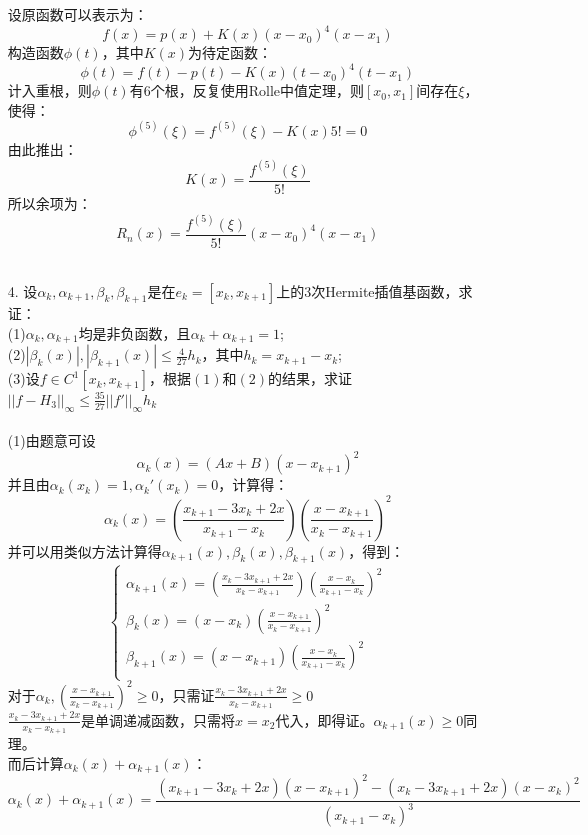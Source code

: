 \documentclass{article}
\begin{document}
\begin{itemize}
		设原函数可以表示为：
		$$f(x) = p(x) + K(x)(x - x_{0})^{4}(x - x_{1})$$
		构造函数$\phi(t)$，其中$K(x)$为待定函数：
		$$\phi(t) = f(t) - p(t) - K(x)(t-x_{0})^{4}(t - x_{1})$$
		计入重根，则$\phi(t)$有6个根，反复使用Rolle中值定理，则$[x_{0}, x_{1}]$间存在$\xi$，使得：
		$$\phi^{(5)}(\xi) = f^{(5)}(\xi) - K(x)5! = 0$$
		由此推出：
		$$K(x) = \frac{ f^{(5)}(\xi)}{5!}$$
		所以余项为：
		$$R_{n}(x) =  \frac{ f^{(5)}(\xi)}{5!}(x - x_{0})^{4}(x - x_{1}) $$\\
		\item[4.]设$\alpha_{k}, \alpha_{k + 1}, \beta_{k}, \beta_{k+1}$是在$e_{k} = [x_{k}, x_{k+1}]$上的3次Hermite插值基函数，求证：\\
		(1)$\alpha_{k}, \alpha_{k + 1}$均是非负函数，且$\alpha_{k} + \alpha_{k + 1} = 1$;\\
		(2)$\left|\beta_{k}(x)\right|,\left|\beta_{k + 1}(x)\right| \le \frac{4}{27}h_{k}$，其中$h_{k} = x_{k+1} - x_{k}$;\\
		(3)设$f\in C^{1}[x_{k}, x_{k+1}]$，根据$(1)$和$(2)$的结果，求证$||f - H_{3}||_{\infty} \le \frac{35}{27}||f'||_{\infty}h_{k}$\\\\
		(1)由题意可设
		$$\alpha_{k}(x) = (Ax + B)(x - x_{k+1})^{2}$$
		并且由$\alpha_{k}(x_{k}) = 1, \alpha_{k}'(x_{k}) = 0$，计算得：
		$$\alpha_{k}(x) = \left(\frac{x_{k+1} - 3x_{k} + 2x}{x_{k+1} - x_{k}}\right)\left(\frac{x - x_{k+1}}{x_{k} - x_{k+1}}\right)^{2}$$
		并可以用类似方法计算得$\alpha_{k+1}(x),\beta_{k}(x), \beta_{k+1}(x)$，得到：
		$$\left\{
		\begin{array}{lcl}
		\alpha_{k+1}(x) = \left(\frac{x_{k} - 3x_{k + 1} + 2x}{x_{k} - x_{k + 1}}\right)\left(\frac{x - x_{k}}{x_{k + 1} - x_{k}}\right)^{2}\\
		\beta_{k}(x) = (x - x_{k})\left(\frac{x-x_{k+1}}{x_{k} - x_{k+1}}\right)^{2}\\
		\beta_{k+1}(x) = (x - x_{k + 1})\left(\frac{x-x_{k}}{x_{k+1} - x_{k}}\right)^{2}\\
		\end{array}\right.$$
		对于$\alpha_{k},\left(\frac{x - x_{k+1}}{x_{k} - x_{k+1}}\right)^{2} \ge 0$，只需证$\frac{x_{k} - 3x_{k + 1} + 2x}{x_{k} - x_{k + 1}} \ge 0$\\
		$\frac{x_{k} - 3x_{k + 1} + 2x}{x_{k} - x_{k + 1}}$是单调递减函数，只需将$x = x_{2}$代入，即得证。$\alpha_{k+1}(x) \ge 0$同理。\\
		而后计算$\alpha_{k}(x) +\alpha_{k + 1}(x)$：
		$$\alpha_{k}(x) +\alpha_{k + 1}(x) = \frac{(x_{k+1} - 3x_{k} +2x)(x - x_{k+1})^{2} - (x_{k} - 3x_{k+1}+ 2x)(x -x_{k})^{2}}{(x_{k+1} - x_{k})^{3}}$$

\end{itemize}
\end{document}
